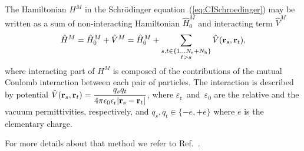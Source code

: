 The Hamiltonian $H^M$ in the Schrödinger equation~(\ref{eq:CISchroedinger}) may be written as a sum of non-interacting Hamiltonian $\hat{H}_0^M$ and interacting term $\hat{V}^M$
%
\begin{equation}
\hat{H} ^M= \hat{H}_0^M + \hat{V}^M = \hat{H} _0^M + \sum_{\substack{s, t \in \{1 \ldots N_{{\rm{e}}}+N_{{\rm{h}}} \}\\t>s} } \hat{V}(\mathbf{r}_s,\mathbf{r}_t), 
\end{equation}
%
where interacting part of $H^M$ is composed of the contributions of the mutual Coulomb interaction between each pair of particles. The interaction is described by potential $\hat{V}(\mathbf{r}_s,\mathbf{r}_t)=\dfrac{q_sq_t}{4\pi \epsilon_0\epsilon_{\rm r} |\mathbf{r}_s - \mathbf{r}_t|}$, where $\varepsilon_\mathrm{r}$~and~$\varepsilon_0$ are the relative and the vacuum permittivities, respectively, and $q_s,q_t\in\{-e,+e\}$ where $e$ is the elementary charge.

For more details about that method we refer to Ref.~\citep{Klenovsky2017}.


\newpage

\newpage 